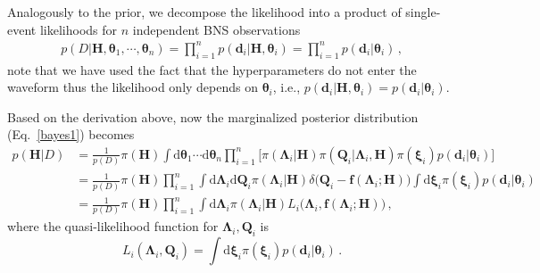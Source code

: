 \documentclass[a4paper,11pt]{article}
\begin{document}
Analogously to the prior, we decompose the likelihood into a product of 
single-event likelihoods for $n$ independent BNS observations
\begin{subequations}
\begin{align}
p(D|\bm{H},\bm{\theta}_1,\cdots,\bm{\theta}_n)=\prod_{i=1}^{n}p(\bm{d}_i|\bm{H},\bm{\theta}_i)=\prod_{i=1}^{n}p(\bm{d}_i|\bm{\theta}_i)\,,
\end{align}   
\end{subequations}
note that we have used the fact that the hyperparameters do not enter the waveform 
thus the likelihood only depends on $\bm{\theta}_i$, i.e., $p(\bm{d}_i|\bm{H},\bm{\theta}_i)=p(\bm{d}_i|\bm{\theta}_i)$.

Based on the derivation above, now the marginalized posterior distribution (Eq.~\eqref{bayes1}) becomes
\begin{equation}
\label{hierarchical bayes}
\begin{aligned}
p(\bm{H}|D)&=\frac{1}{p(D)}\pi(\bm{H})\int \text{d}\bm{\theta}_1\cdots\text{d}\bm{\theta}_n \prod_{i=1}^n \big[\pi(\bm{\Lambda}_i|\bm{H})\pi(\bm{Q}_i|\bm{\Lambda}_i,\bm{H})\pi(\bm{\xi}_i)p(\bm{d}_i|\bm{\theta}_i)\big] \\
&=\frac{1}{p(D)} \pi(\bm{H}) \prod_{i=1}^n
\int \text{d}\bm{\Lambda}_i\text{d}\bm{Q}_i\pi(\bm{\Lambda}_i|\bm{H})\delta\big(\bm{Q}_i-\bm{f}(\bm{\Lambda}_i;\bm{H})\big) \int \text{d}\bm{\xi}_i \pi(\bm{\xi}_i)p(\bm{d}_i|\bm{\theta}_i)\\
&=\frac{1}{p(D)} \pi(\bm{H}) \prod_{i=1}^n
\int \text{d}\bm{\Lambda}_i\pi(\bm{\Lambda}_i|\bm{H})L_i\big(\bm{\Lambda}_i,\bm{f}(\bm{\Lambda}_i;\bm{H})\big)\,,
\end{aligned}
\end{equation}
where the quasi-likelihood function for $\bm{\Lambda}_i,\bm{Q}_i$ is
\begin{equation}
\label{quasi-likelihood}
    L_i(\bm{\Lambda}_i,\bm{Q}_i)=\int \text{d}\bm{\xi}_i \pi(\bm{\xi}_i)p(\bm{d}_i|\bm{\theta}_i)\,.
\end{equation}

\end{document}
